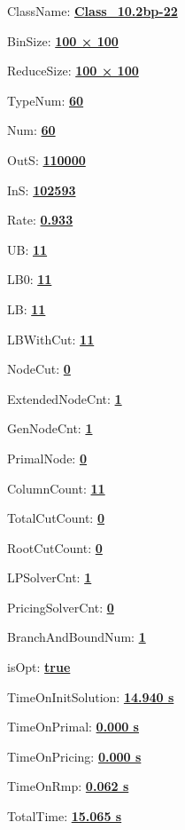 \documentclass[11pt]{article}
\begin{document}
\pagestyle{empty}


ClassName: \underline{\textbf{Class_10.2bp-22}}
\par
BinSize: \underline{\textbf{100 × 100}}
\par
ReduceSize: \underline{\textbf{100 × 100}}
\par
TypeNum: \underline{\textbf{60}}
\par
Num: \underline{\textbf{60}}
\par
OutS: \underline{\textbf{110000}}
\par
InS: \underline{\textbf{102593}}
\par
Rate: \underline{\textbf{0.933}}
\par
UB: \underline{\textbf{11}}
\par
LB0: \underline{\textbf{11}}
\par
LB: \underline{\textbf{11}}
\par
LBWithCut: \underline{\textbf{11}}
\par
NodeCut: \underline{\textbf{0}}
\par
ExtendedNodeCnt: \underline{\textbf{1}}
\par
GenNodeCnt: \underline{\textbf{1}}
\par
PrimalNode: \underline{\textbf{0}}
\par
ColumnCount: \underline{\textbf{11}}
\par
TotalCutCount: \underline{\textbf{0}}
\par
RootCutCount: \underline{\textbf{0}}
\par
LPSolverCnt: \underline{\textbf{1}}
\par
PricingSolverCnt: \underline{\textbf{0}}
\par
BranchAndBoundNum: \underline{\textbf{1}}
\par
isOpt: \underline{\textbf{true}}
\par
TimeOnInitSolution: \underline{\textbf{14.940 s}}
\par
TimeOnPrimal: \underline{\textbf{0.000 s}}
\par
TimeOnPricing: \underline{\textbf{0.000 s}}
\par
TimeOnRmp: \underline{\textbf{0.062 s}}
\par
TotalTime: \underline{\textbf{15.065 s}}
\par
\newpage


\end{document}

